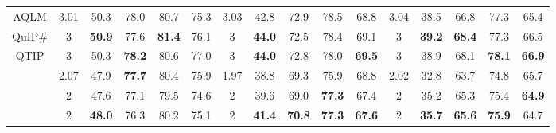 \begin{table}[t]
\begin{tabular}{@{}cccccccccccccccc@{}}
\multicolumn{1}{c|}{AQLM}                           & 3.01 & 50.3          & 78.0          & 80.7          & \multicolumn{1}{c|}{75.3}                                  & 3.03 & 42.8          & 72.9          & 78.5          & \multicolumn{1}{c|}{68.8}                                  & 3.04 & 38.5          & 66.8          & 77.3          & 65.4          \\
\multicolumn{1}{c|}{QuIP\#}                         & 3    & \textbf{50.9} & 77.6          & \textbf{81.4} & \multicolumn{1}{c|}{76.1}                                  & 3    & \textbf{44.0} & 72.5          & 78.4          & \multicolumn{1}{c|}{69.1}                                  & 3    & \textbf{39.2} & \textbf{68.4} & 77.3          & 66.5          \\
\multicolumn{1}{c|}{QTIP}                           & 3    & 50.3          & \textbf{78.2} & 80.6          & \multicolumn{1}{c|}{77.0}                                  & 3    & \textbf{44.0} & 72.8          & 78.0          & \multicolumn{1}{c|}{\textbf{69.5}}                         & 3    & 38.9          & 68.1          & \textbf{78.1} & \textbf{66.9} \\
\rowcolor[HTML]{D9D9D9} 
\multicolumn{1}{c|}{\cellcolor[HTML]{D9D9D9}AQLM}   & 2.07 & 47.9          & \textbf{77.7} & 80.4          & \multicolumn{1}{c|}{\cellcolor[HTML]{D9D9D9}75.9}          & 1.97 & 38.8          & 69.3          & 75.9          & \multicolumn{1}{c|}{\cellcolor[HTML]{D9D9D9}68.8}          & 2.02 & 32.8          & 63.7          & 74.8          & 65.7          \\
\rowcolor[HTML]{D9D9D9} 
\multicolumn{1}{c|}{\cellcolor[HTML]{D9D9D9}QuIP\#} & 2    & 47.6          & 77.1          & 79.5          & \multicolumn{1}{c|}{\cellcolor[HTML]{D9D9D9}74.6}          & 2    & 39.6          & 69.0          & \textbf{77.3} & \multicolumn{1}{c|}{\cellcolor[HTML]{D9D9D9}67.4}          & 2    & 35.2          & 65.3          & 75.4          & \textbf{64.9} \\
\rowcolor[HTML]{D9D9D9} 
\multicolumn{1}{c|}{\cellcolor[HTML]{D9D9D9}QTIP}   & 2    & \textbf{48.0} & 76.3          & 80.2          & \multicolumn{1}{c|}{\cellcolor[HTML]{D9D9D9}75.1}          & 2    & \textbf{41.4} & \textbf{70.8} & \textbf{77.3} & \multicolumn{1}{c|}{\cellcolor[HTML]{D9D9D9}\textbf{67.6}} & 2    & \textbf{35.7} & \textbf{65.6} & \textbf{75.9} & 64.7          \\ \bottomrule
\end{tabular}
\label{tab:hybftzs}
\end{table}